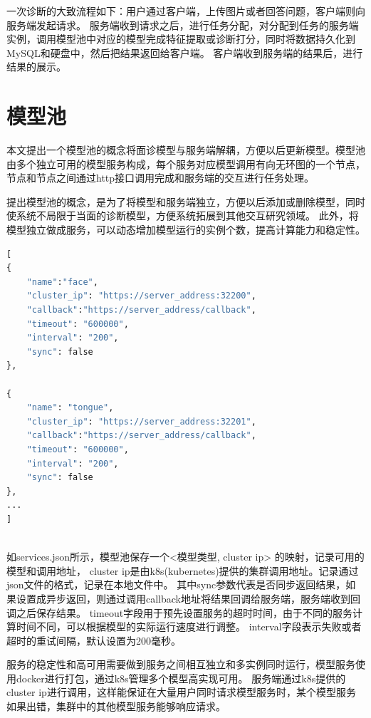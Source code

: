 一次诊断的大致流程如下：用户通过客户端，上传图片或者回答问题，客户端则向服务端发起请求。
服务端收到请求之后，进行任务分配，对分配到任务的服务端实例，调用模型池中对应的模型完成特征提取或诊断打分，同时将数据持久化到MySQL和硬盘中，然后把结果返回给客户端。
客户端收到服务端的结果后，进行结果的展示。

\section{模型池}
本文提出一个模型池的概念将面诊模型与服务端解耦，方便以后更新模型。模型池由多个独立可用的模型服务构成，每个服务对应模型调用有向无环图的一个节点，节点和节点之间通过http接口调用完成和服务端的交互进行任务处理。

提出模型池的概念，是为了将模型和服务端独立，方便以后添加或删除模型，同时使系统不局限于当面的诊断模型，方便系统拓展到其他交互研究领域。
此外，将模型独立做成服务，可以动态增加模型运行的实例个数，提高计算能力和稳定性。



\begin{lstlisting}[language={Python}, title=services.json]
[
{
    "name":"face",
    "cluster_ip": "https://server_address:32200",
    "callback":"https://server_address/callback",
    "timeout": "600000",
    "interval": "200",
    "sync": false
}, 

{
    "name": "tongue",
    "cluster_ip": "https://server_address:32201",
    "callback":"https://server_address/callback",
    "timeout": "600000",
    "interval": "200",
    "sync": false
},
...
]
    
\end{lstlisting}

如services.json所示，模型池保存一个<模型类型, cluster ip> 的映射，记录可用的模型和调用地址， cluster ip是由k8s(kubernetes)提供的集群调用地址。记录通过json文件的格式，记录在本地文件中。
其中sync参数代表是否同步返回结果，如果设置成异步返回，则通过调用callback地址将结果回调给服务端，服务端收到回调之后保存结果。
timeout字段用于预先设置服务的超时时间，由于不同的服务计算时间不同，可以根据模型的实际运行速度进行调整。
interval字段表示失败或者超时的重试间隔，默认设置为200毫秒。

服务的稳定性和高可用需要做到服务之间相互独立和多实例同时运行，模型服务使用docker进行打包，通过k8s管理多个模型高实现可用。
服务端通过k8s提供的cluster ip进行调用，这样能保证在大量用户同时请求模型服务时，某个模型服务如果出错，集群中的其他模型服务能够响应请求。


